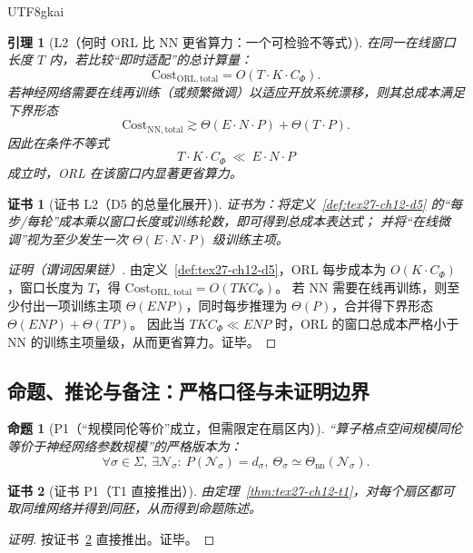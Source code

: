 \documentclass[12pt]{article}
\newtheorem{proposition}{命题}[section]
\newtheorem{lemma}{引理}[section]
\newtheorem{Certificate}{证书}[section]
\begin{document}
\begin{CJK*}{UTF8}{gkai}
\begin{lemma}[L2（何时 ORL 比 NN 更省算力：一个可检验不等式）]
\label{lem:tex27-ch12-l2}
在同一在线窗口长度 $T$ 内，若比较“即时适配”的总计算量：
\[
  \mathrm{Cost}_{\mathrm{ORL,total}}=O(T\cdot K\cdot C_\Phi).
\]
若神经网络需要在线再训练（或频繁微调）以适应开放系统漂移，则其总成本满足下界形态
\[
  \mathrm{Cost}_{\mathrm{NN,total}}\gtrsim \Theta(E\cdot N\cdot P)+\Theta(T\cdot P).
\]
因此在条件不等式
\[
  T\cdot K\cdot C_\Phi\ \ll\ E\cdot N\cdot P
\]
成立时，ORL 在该窗口内显著更省算力。
\end{lemma}

\begin{Certificate}[证书 L2（D5 的总量化展开）]
\label{cert:tex27-ch12-l2}
证书为：将定义~\ref{def:tex27-ch12-d5} 的“每步/每轮”成本乘以窗口长度或训练轮数，即可得到总成本表达式；
并将“在线微调”视为至少发生一次 $\Theta(E\cdot N\cdot P)$ 级训练主项。
\end{Certificate}

\begin{proof}[证明（谓词因果链）]
由定义~\ref{def:tex27-ch12-d5}，ORL 每步成本为 $O(K\cdot C_\Phi)$，窗口长度为 $T$，得 $\mathrm{Cost}_{\mathrm{ORL,total}}=O(TKC_\Phi)$。
若 NN 需要在线再训练，则至少付出一项训练主项 $\Theta(E N P)$，同时每步推理为 $\Theta(P)$，合并得下界形态 $\Theta(E N P)+\Theta(TP)$。
因此当 $TKC_\Phi\ll ENP$ 时，ORL 的窗口总成本严格小于 NN 的训练主项量级，从而更省算力。证毕。
\end{proof}

\subsection{命题、推论与备注：严格口径与未证明边界}
\label{subsec:tex27-ch12-props}

\begin{proposition}[P1（“规模同伦等价”成立，但需限定在扇区内）]
\label{prop:tex27-ch12-p1}
“算子格点空间规模同伦等价于神经网络参数规模”的严格版本为：
\[
  \forall \sigma\in\Sigma,\ \exists \mathcal{N}_\sigma:\ P(\mathcal{N}_\sigma)=d_\sigma,\ \Theta_\sigma \simeq
    \Theta_{\mathrm{nn}}(\mathcal{N}_\sigma).
\]
\end{proposition}

\begin{Certificate}[证书 P1（T1 直接推出）]
\label{cert:tex27-ch12-p1}
由定理~\ref{thm:tex27-ch12-t1}，对每个扇区都可取同维网络并得到同胚，从而得到命题陈述。
\end{Certificate}

\begin{proof}[证明]
按证书~\ref{cert:tex27-ch12-p1} 直接推出。证毕。
\end{proof}


\end{CJK*}
\end{document}
